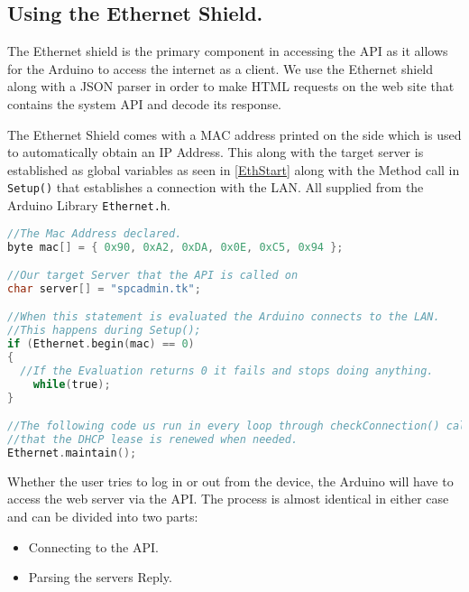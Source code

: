 \subsection{Using the Ethernet Shield.}
\label{sec:ethernetshield}
The Ethernet shield is the primary component in accessing the API as it allows for the Arduino to access the internet as a client.
We use the Ethernet shield along with a JSON parser in order to make HTML requests on the web site that contains the system API and decode its response.

The Ethernet Shield comes with a MAC address printed on the side which is used to automatically obtain an IP Address.
This along with the target server is established as global variables as seen in \autoref{EthStart} along with the Method call in \verb|Setup()| that establishes a connection with the LAN. All supplied from the Arduino Library \verb|Ethernet.h|.
\begin{lstlisting}[frame=single,language=C, label=EthStart, caption=The Method Calls used to establish and maintain a connection.]
//The Mac Address declared.
byte mac[] = { 0x90, 0xA2, 0xDA, 0x0E, 0xC5, 0x94 };

//Our target Server that the API is called on
char server[] = "spcadmin.tk";

//When this statement is evaluated the Arduino connects to the LAN.
//This happens during Setup();
if (Ethernet.begin(mac) == 0) 
{
  //If the Evaluation returns 0 it fails and stops doing anything.
	while(true); 
}

//The following code us run in every loop through checkConnection() call to assure
//that the DHCP lease is renewed when needed.
Ethernet.maintain();
\end{lstlisting}

Whether the user tries to log in or out from the device, the Arduino will have to access the web server via the API.
The process is almost identical in either case and can be divided into two parts:
\begin{itemize}
	\item Connecting to the API.
	\item Parsing the servers Reply.
\end{itemize}

